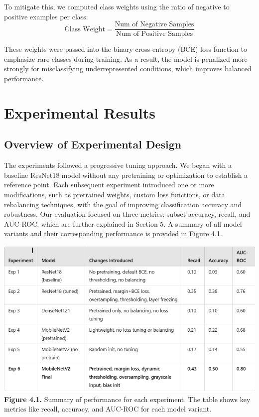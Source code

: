 \documentclass[12pt]{article}
\begin{document}
\begin{multicols}{2}
To mitigate this, we computed class weights using the ratio of negative to positive examples per class:
\[
\text{Class Weight} = \frac{\text{Num of Negative Samples}}{\text{Num of Positive Samples}}
\]

These weights were passed into the binary cross-entropy (BCE) loss function to emphasize rare classes during training. As a result, the model is penalized more strongly for misclassifying underrepresented conditions, which improves balanced performance.

\section{Experimental Results}

\subsection{Overview of Experimental Design}

The experiments followed a progressive tuning approach. We began with a baseline ResNet18 model without any pretraining or optimization to establish a reference point. Each subsequent experiment introduced one or more modifications, such as pretrained weights, custom loss functions, or data rebalancing techniques, with the goal of improving classification accuracy and robustness. Our evaluation focused on three metrics: subset accuracy, recall, and AUC-ROC, which are further explained in Section 5. A summary of all model variants and their corresponding performance is provided in Figure 4.1.

\begin{center}
    \includegraphics[width=\linewidth]{figure4.1.png}
    \textbf{Figure 4.1.} Summary of performance for each experiment. The table shows key metrics like recall, accuracy, and AUC-ROC for each model variant.
\end{center}


\end{multicols}
\end{document}
